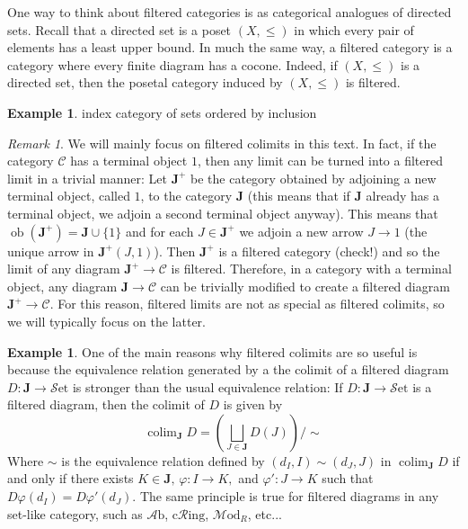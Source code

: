 \documentclass[10pt,oneside]{book}
\def\~#1{\mathscr{#1}}
\newcommand{\colim}{\mathop{\mathrm{colim}}}
\newcommand{\ob}{\mathop{\mathrm{ob}}}
\newcommand{\Set}{\~S\mathrm{et}}
\newcommand{\Ab}{\~A\mathrm{b}}
\newcommand{\cRing}{\mathrm{c}\~{R}\mathrm{ing}}
\newcommand{\Mod}{\~M\mathrm{od}}
\newcommand{\vp}{\varphi}
\theoremstyle{plain}
\theoremstyle{definition}
\newtheorem{ex}[thm]{Example}
\theoremstyle{remark}
\newtheorem*{rmk}{Remark}
\numberwithin{equation}{section}
\numberwithin{figure}{section}
\begin{document}
One way to think about filtered categories is as categorical analogues of directed sets. Recall that a directed set is a poset $(X, \leq)$ in which every pair of elements has a least upper bound. In much the same way, a filtered category is a category where every finite diagram has a cocone. Indeed, if $(X, \leq)$ is a directed set, then the posetal category induced by $(X, \leq)$ is filtered. 



\begin{ex}
    index category of sets ordered by inclusion
\end{ex}

\begin{rmk}
We will mainly focus on filtered colimits in this text. In fact, if the category $\~C$ has a terminal object $1$, then any limit can be turned into a filtered limit in a trivial manner: Let $\mathbf{J}^+$ be the category obtained by adjoining a new terminal object, called $1$, to the category $\mathbf{J}$ (this means that if $\mathbf{J}$ already has a terminal object, we adjoin a second terminal object anyway). This means that $\ob({\mathbf{J}^+}) = \mathbf{J} \cup \{1\}$ and for each $J \in \mathbf{J}^+$ we adjoin a new arrow $J \to 1$ (the unique arrow in $\mathbf{J}^+(J, 1)$). Then $\mathbf{J}^+$ is a filtered category (check!) and so the limit of any diagram $\mathbf{J}^+ \to \~C$ is filtered. Therefore, in a category with a terminal object, any diagram $\mathbf{J} \to \~C$ can be trivially modified to create a filtered diagram $\mathbf{J}^+ \to \~C$. For this reason, filtered limits are not as special as filtered colimits, so we will typically focus on the latter.
\end{rmk}

\begin{ex}
One of the main reasons why filtered colimits are so useful is because the equivalence relation generated by a the colimit of a filtered diagram $D: \mathbf{J} \to \Set$ is stronger than the usual equivalence relation: If $D: \mathbf{J} \to \Set$ is a filtered diagram, then the colimit of $D$ is given by
\[\colim_{\mathbf{J}} D = \left(\bigsqcup_{J \in \mathbf{J}} D(J)  \right) \bigg/ \sim \]
Where $\sim$ is the equivalence relation defined by $(d_I, I) \sim (d_J, J)$ in $\colim_\mathbf{J}D$ if and only if there exists $K \in \mathbf{J}, \, \vp: I \to K,$ and $\vp': J \to K$ such that $D\vp(d_I) = D\vp'(d_J)$. The same principle is true for filtered diagrams in any set-like category, such as $\Ab$, $\cRing$, $\Mod_R$, etc... 
\end{ex}
\end{document}
